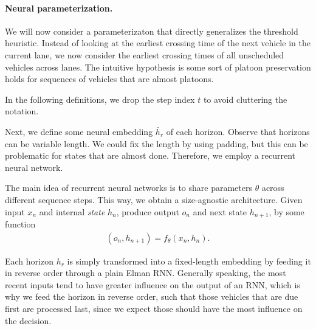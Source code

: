 \documentclass[a4paper]{report}
\theoremstyle{definition}
\theoremstyle{plain}
\newcommand\note[1]{{\color{Navy}\noindent#1}}
\begin{document}


\paragraph{Neural parameterization.}

We will now consider a parameterizaton that directly generalizes the
threshold heuristic. Instead of looking at the earliest crossing time of the
next vehicle in the current lane, we now consider the earliest crossing
times of all unscheduled vehicles across lanes.
%
The intuitive hypothesis is some sort of platoon preservation holds for
sequences of vehicles that are almost platoons.

\note{In the following definitions, we drop the step index $t$ to avoid
cluttering the notation.}

Next, we define some neural embedding $\bar{h}_{r}$ of each horizon. Observe
that horizons can be variable length. We could fix the length by using padding,
but this can be problematic for states that are almost done. Therefore, we
employ a recurrent neural network.

The main idea of recurrent neural networks is to share parameters $\theta$
across different sequence steps.
This way, we obtain a size-agnostic architecture.
%
Given input $x_n$ and internal \emph{state} $h_n$, produce output $o_n$ and next
state $h_{n+1}$, by some function
\begin{align}
  (o_{n}, h_{n+1}) = f_\theta(x_n, h_n) .
\end{align}

Each horizon $h_r$ is simply transformed into
a fixed-length embedding by feeding it in reverse order through a plain Elman
RNN. Generally speaking, the most recent inputs tend to have greater influence
on the output of an RNN, which is why we feed the horizon in reverse order, such
that those vehicles that are due first are processed last, since we expect those
should have the most influence on the decision.
\end{document}
